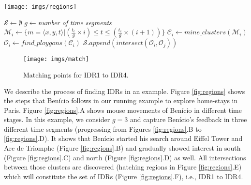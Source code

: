 \begin{figure*}[t]
\centering
   \texttt{[image: imgs/regions]}
  \caption{The process of finding IDRs on Airbnb dataset.}
  \label{fig:regions}
\end{figure*}

\begin{algorithm}[t]
\DontPrintSemicolon
{}
$\mathcal{S} \gets \emptyset$\;
$g \gets ${\em number of time segments}\;
{
       $\mathcal{M}_i \gets \{m = \langle x,y,t \rangle | (\frac{t_c}{g} \times i) \leq t \leq (\frac{t_c}{g} \times (i+1))\}$\;
       $\mathcal{C}_i \gets \mathit{mine\_clusters}(\mathcal{M}_i)$\label{ln:mine}\;
       $\mathcal{O}_i \gets \mathit{find\_ploygons}(\mathcal{C}_i)$\label{ln:poly}\;
}
{
       $\mathcal{S}.\mathit{append}(\mathit{intersect}(\mathcal{O}_i, \mathcal{O}_j))$
}
\; 
\caption{Find Interesting Dense Regions (IDRs)}
\label{algo:dense}
\end{algorithm}

\begin{figure}[t]
\centering
   \texttt{[image: imgs/match]}
  \caption{Matching points for IDR1 to IDR4.}
  \label{fig:match}
\end{figure}

\vspace{2pt}
We describe the process of finding IDRs in an example. Figure \ref{fig:regions} shows the steps that Ben\'icio follows in our running example to explore home-stays in Paris. Figure \ref{fig:regions}.A shows mouse movements of Ben\'icio in different time stages. In this example, we consider $g = 3$ and capture Ben\'icio's feedback in three different time segments (progressing from Figures \ref{fig:regions}.B to \ref{fig:regions}.D). It shows that Ben\'icio started his search around Eiffel Tower and Arc de Triomphe (Figure \ref{fig:regions}.B) and gradually showed interest in south (Figure \ref{fig:regions}.C) and north (Figure \ref{fig:regions}.D) as well. All intersections between those clusters are discovered (hatching regions in Figure \ref{fig:regions}.E) which will constitute the set of IDRs (Figure \ref{fig:regions}.F), i.e., IDR1 to IDR4.

